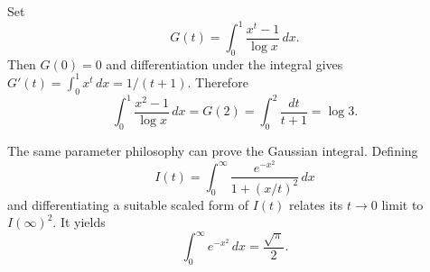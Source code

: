 \begin{example}
Set
\begin{equation}
G(t)=\int_0^1\frac{x^t-1}{\log x}\,dx.
\end{equation}
Then $G(0)=0$ and differentiation under the integral gives $G'(t)=\int_0^1x^t\,dx=1/(t+1)$. Therefore
\begin{equation}
\int_0^1\frac{x^2-1}{\log x}\,dx=G(2)=\int_0^2\frac{dt}{t+1}=\log3.
\end{equation}
\end{example}

The same parameter philosophy can prove the Gaussian integral. Defining
\begin{equation}
I(t)=\int_0^\infty\frac{e^{-x^2}}{1+(x/t)^2}\,dx
\end{equation}
and differentiating a suitable scaled form of $I(t)$ relates its $t\to0$ limit to $I(\infty)^2$. It yields
\begin{equation}
\int_0^\infty e^{-x^2}\,dx=\frac{\sqrt{\pi}}{2}.
\end{equation}